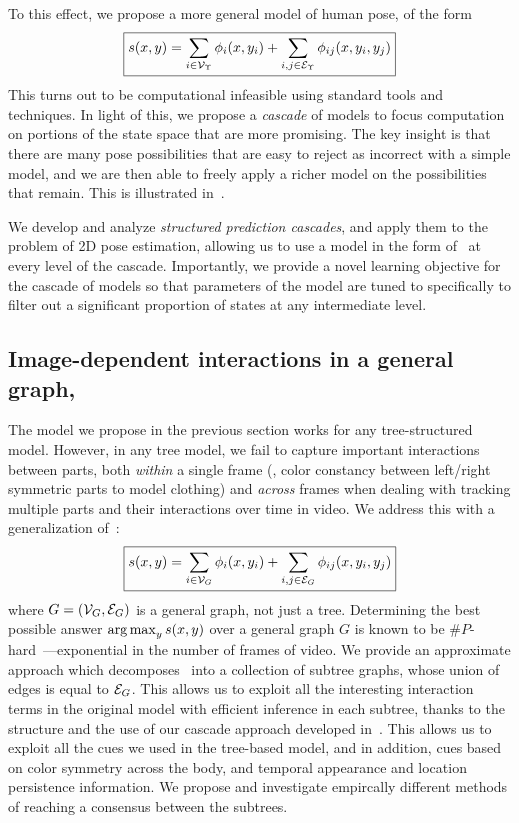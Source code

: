 To this effect, we propose a more general model of human pose, of the form 
\begin{equation}
\boxed{s(x,y) =  \sum_{i \in \mathcal{V}_{\Upsilon}} \phi_i(x,y_i) + \sum_{i,j \in 
\mathcal{E}_{\Upsilon}} \phi_{ij}(x,y_i,y_j)}
\label{eq:contrib1}
\end{equation}
This turns out to be computational infeasible using standard tools and techniques.  In light of this, we propose a {\em cascade} of models to focus computation on portions of the state space that are more promising.  The key insight is that there are many pose possibilities that are easy to reject as incorrect with a simple model, and we are then able to freely apply a richer model on the possibilities that remain.  This is illustrated in~.

We develop and analyze {\em structured prediction cascades}, and apply them to 
the problem of 2D pose estimation, allowing us to use a model in the form 
of~ at every level of the cascade.  Importantly, we provide a 
novel learning objective for the cascade of models so that parameters of the 
model are tuned to specifically to filter out a significant proportion of 
states at any intermediate level. 

\subsection{Image-dependent interactions in a general 
graph,~}
The model we propose in the previous section works for any tree-structured 
model.  However, in any tree model, we fail to capture important interactions 
between parts, both {\em within} a single frame (\eg, color constancy between 
left/right symmetric parts to model clothing) and {\em across} frames when 
dealing with tracking multiple parts and their interactions over time in video.  
We address this with a generalization of~:
\begin{equation}
\boxed{s(x,y) =  \sum_{i \in \mathcal{V}_{G}} \phi_i(x,y_i) + \sum_{i,j \in \mathcal{E}_{G}} 
\phi_{ij}(x,y_i,y_j)}
\label{eq:contrib2}
\end{equation}
where $G = (\mathcal{V}_G,\mathcal{E}_G)$ is a general graph, not just a tree.  Determining the 
best possible answer $\mathop{\arg\max}_y s(x,y)$ over a general graph $G$ is known to be 
$\#P$-hard~\citep{koller-book}---exponential in the number of frames of video.  
We provide an approximate approach which decomposes~ into a 
collection of subtree graphs, whose union of edges is equal to $\mathcal{E}_G$.  This 
allows us to exploit all the interesting interaction terms in the original 
model with efficient inference in each subtree, thanks to the structure and the 
use of our cascade approach developed in~.  This allows us to 
exploit all the cues we used in the tree-based model, and in addition, cues 
based on color symmetry across the body, and temporal appearance and location 
persistence information.  We propose and investigate empircally different 
methods of reaching a consensus between the subtrees.

